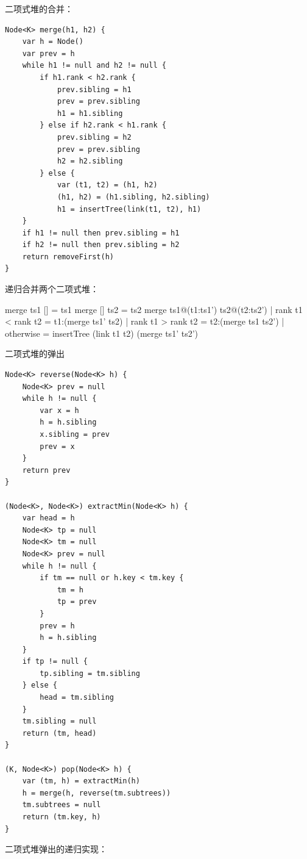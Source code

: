 \documentclass[b5paper]{ctexart}
\begin{document}
二项式堆的合并：

\begin{lstlisting}[language = Bourbaki]
Node<K> merge(h1, h2) {
    var h = Node()
    var prev = h
    while h1 != null and h2 != null {
        if h1.rank < h2.rank {
            prev.sibling = h1
            prev = prev.sibling
            h1 = h1.sibling
        } else if h2.rank < h1.rank {
            prev.sibling = h2
            prev = prev.sibling
            h2 = h2.sibling
        } else {
            var (t1, t2) = (h1, h2)
            (h1, h2) = (h1.sibling, h2.sibling)
            h1 = insertTree(link(t1, t2), h1)
    }
    if h1 != null then prev.sibling = h1
    if h2 != null then prev.sibling = h2
    return removeFirst(h)
}
\end{lstlisting}

递归合并两个二项式堆：

\begin{Haskell}
merge ts1 [] = ts1
merge [] ts2 = ts2
merge ts1@(t1:ts1') ts2@(t2:ts2')
    | rank t1 < rank t2 = t1:(merge ts1' ts2)
    | rank t1 > rank t2 = t2:(merge ts1 ts2')
    | otherwise = insertTree (link t1 t2) (merge ts1' ts2')
\end{Haskell}

二项式堆的弹出

\begin{lstlisting}[language = Bourbaki]
Node<K> reverse(Node<K> h) {
    Node<K> prev = null
    while h != null {
        var x = h
        h = h.sibling
        x.sibling = prev
        prev = x
    }
    return prev
}

(Node<K>, Node<K>) extractMin(Node<K> h) {
    var head = h
    Node<K> tp = null
    Node<K> tm = null
    Node<K> prev = null
    while h != null {
        if tm == null or h.key < tm.key {
            tm = h
            tp = prev
        }
        prev = h
        h = h.sibling
    }
    if tp != null {
        tp.sibling = tm.sibling
    } else {
        head = tm.sibling
    }
    tm.sibling = null
    return (tm, head)
}

(K, Node<K>) pop(Node<K> h) {
    var (tm, h) = extractMin(h)
    h = merge(h, reverse(tm.subtrees))
    tm.subtrees = null
    return (tm.key, h)
}
\end{lstlisting}

二项式堆弹出的递归实现：

\end{document}
